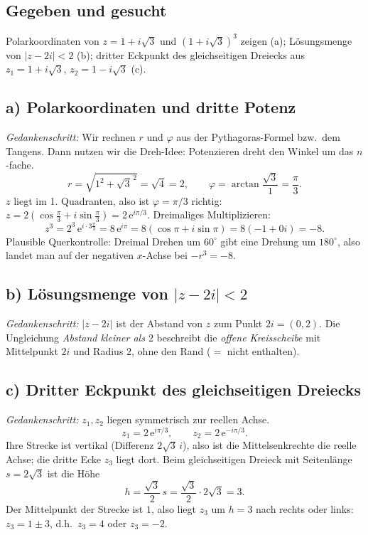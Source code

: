 
\subsection*{Gegeben und gesucht}
Polarkoordinaten von $z=1+i\sqrt3$ und $(1+i\sqrt3)^3$ zeigen (a);
Lösungsmenge von $|z-2i|<2$ (b); dritter Eckpunkt des gleichseitigen
Dreiecks aus $z_1=1+i\sqrt3$, $z_2=1-i\sqrt3$ (c).

\subsection*{a) Polarkoordinaten und dritte Potenz}
\emph{Gedankenschritt:} Wir rechnen $r$ und $\varphi$ aus der
Pythagoras-Formel bzw.\ dem Tangens. Dann nutzen wir die
Dreh-Idee: Potenzieren dreht den Winkel um das $n$-fache.
\begin{equation*}
  r=\sqrt{1^2+\sqrt3^{\,2}}=\sqrt{4}=2,\qquad
  \varphi=\arctan\frac{\sqrt3}{1}=\frac\pi3 .
\end{equation*}
$z$ liegt im 1. Quadranten, also ist $\varphi=\pi/3$ richtig:
$z=2(\cos\frac\pi3+i\sin\frac\pi3)=2\,\mathrm e^{i\pi/3}$. Dreimaliges
Multiplizieren:
\begin{equation*}
  z^3=2^3\,\mathrm e^{i\cdot3\frac\pi3}
  =8\,\mathrm e^{i\pi}
  =8(\cos\pi+i\sin\pi)=8(-1+0i)=-8 .
\end{equation*}
Plausible Querkontrolle: Dreimal Drehen um $60^\circ$ gibt eine Drehung um
$180^\circ$, also landet man auf der negativen $x$-Achse bei $-r^3=-8$.

\subsection*{b) Lösungsmenge von $|z-2i|<2$}
\emph{Gedankenschritt:} $|z-2i|$ ist der Abstand von $z$ zum Punkt
$2i=(0,2)$. Die Ungleichung \emph{Abstand kleiner als $2$} beschreibt die
\emph{offene Kreisscheibe} mit Mittelpunkt $2i$ und Radius $2$, ohne den
Rand ($=$ nicht enthalten).

\subsection*{c) Dritter Eckpunkt des gleichseitigen Dreiecks}
\emph{Gedankenschritt:} $z_1,z_2$ liegen symmetrisch zur reellen Achse.
\begin{equation*}
  z_1=2\,\mathrm e^{i\pi/3},\qquad z_2=2\,\mathrm e^{-i\pi/3}.
\end{equation*}
Ihre Strecke ist vertikal (Differenz $2\sqrt3\,i$), also ist die
Mittelsenkrechte die reelle Achse; die dritte Ecke $z_3$ liegt dort. Beim
gleichseitigen Dreieck mit Seitenlänge $s=2\sqrt3$ ist die Höhe
\begin{equation*}
  h=\frac{\sqrt3}{2}\,s=\frac{\sqrt3}{2}\cdot2\sqrt3=3 .
\end{equation*}
Der Mittelpunkt der Strecke ist $1$, also liegt $z_3$ um $h=3$ nach rechts
oder links: $z_3=1\pm3$, d.h.\ $z_3=4$ oder $z_3=-2$.

